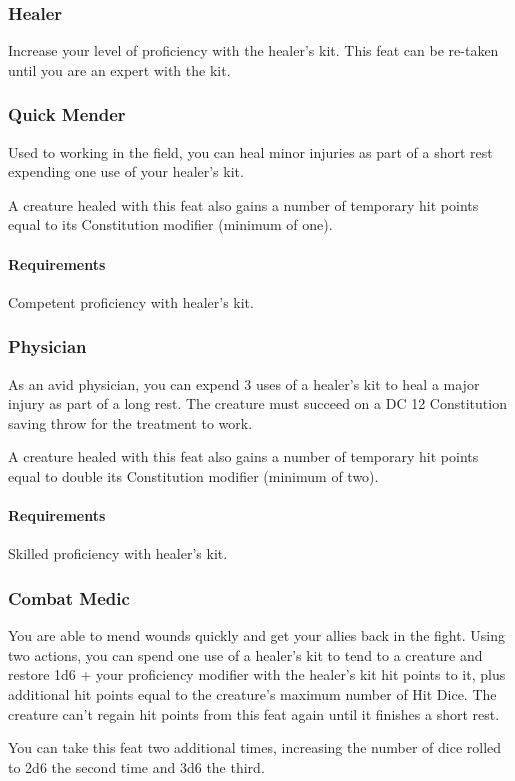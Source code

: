 \subsubsection{Healer} \label{feat::healer}
    Increase your level of proficiency with the healer's kit.
    This feat can be re-taken until you are an expert with the kit.
\subsubsection{Quick Mender} \label{feat::quickmender}
    Used to working in the field, you can heal minor injuries as part of a short rest expending one use of your healer's kit.

    A creature healed with this feat also gains a number of temporary hit points equal to its Constitution modifier (minimum of one).
    \paragraph{Requirements} Competent proficiency with healer's kit.
\subsubsection{Physician} \label{feat::physician}
    As an avid physician, you can expend 3 uses of a healer's kit to heal a major injury as part of a long rest.
    The creature must succeed on a DC 12 Constitution saving throw for the treatment to work.

    A creature healed with this feat also gains a number of temporary hit points equal to double its Constitution modifier (minimum of two).
    \paragraph{Requirements} Skilled proficiency with healer's kit.
\subsubsection{Combat Medic} \label{feat::combatmedic}
    You are able to mend wounds quickly and get your allies back in the fight.
    Using two actions, you can spend one use of a healer's kit to tend to a creature and restore 1d6 + your proficiency modifier with the healer's kit hit points to it, plus additional hit points equal to the creature's maximum number of Hit Dice.
    The creature can't regain hit points from this feat again until it finishes a short rest.

    You can take this feat two additional times, increasing the number of dice rolled to 2d6 the second time and 3d6 the third.
